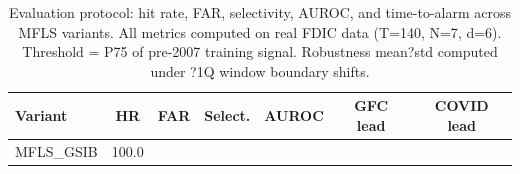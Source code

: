 \begin{table}[htbp]
\centering
\caption{Evaluation protocol: hit rate, FAR, selectivity, AUROC, and time-to-alarm across MFLS variants. All metrics computed on real FDIC data (T=140, N=7, d=6). Threshold = P75 of pre-2007 training signal. Robustness mean?std computed under ?1Q window boundary shifts.}
\label{tab:eval_protocol}
\begin{tabular}{lcccccc}
\toprule
Variant & HR & FAR & Select. & AUROC & GFC lead & COVID lead \\
\midrule
MFLS_GSIB & 100.0%
\bottomrule
\end{tabular}
\end{table}
